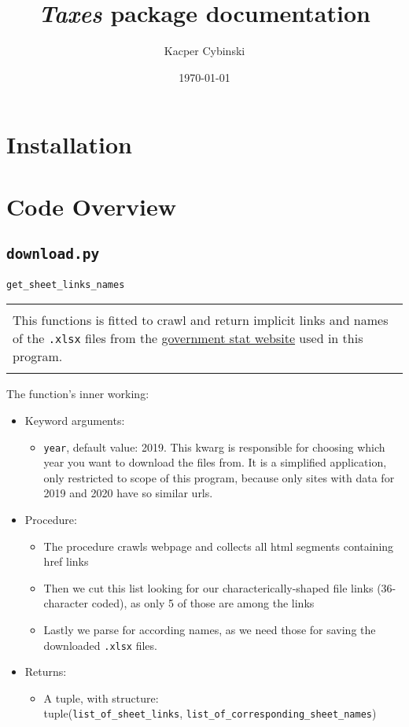 \documentclass[12pt,a4paper]{article}
\title{\textit{Taxes} package documentation}
\author{Kacper Cybinski}
\date{\today}
\newcommand{\code}[1]{\texttt{#1}}
\newenvironment{func}[1]
    {\begin{center}
    #1\\[1ex]
    \begin{tabular}{|p{0.9\textwidth}|}
    \hline\\
    }
    {
    \\\\\hline
    \end{tabular}
    \end{center}
    }
\begin{document}
\newenvironment{details}[3]
    {The function's inner working:
    \begin{itemize}
    \item Keyword arguments: \begin{itemize}
    #1
    \end{itemize}
    \item Procedure: \begin{itemize}
    #2
    \end{itemize}
    \item Returns: \begin{itemize}
    #3
    \end{itemize}
    \end{itemize}
    }
    {
    \bigskip
    }

\maketitle

\section{Installation}

\section{Code Overview}

\subsection{\texttt{download.py}}
\begin{func}{\texttt{get\_sheet\_links\_names}}
This functions is fitted to crawl and return implicit links and names of the \code{.xlsx} files from the  \href{https://www.gov.pl/web/finanse/udzialy-za-2020-r}{government stat website} used in this program.
\end{func}

\begin{details}{
\item \code{year}, default value: 2019. This kwarg is responsible for choosing which year you want to download the files from. It is a simplified application, only restricted to scope of this program, because only sites with data for 2019 and 2020 have so similar urls.
}{
\item The procedure crawls webpage and collects all html segments containing href links
\item Then we cut this list looking for our characterically-shaped file links (36-character coded), as only 5 of those are among the links
\item Lastly we parse for according names, as we need those for saving the downloaded \code{.xlsx} files.
}{
\item A tuple, with structure: \\tuple(\code{list\_of\_sheet\_links}, \code{list\_of\_corresponding\_sheet\_names})
}
\end{details}
\end{document}
